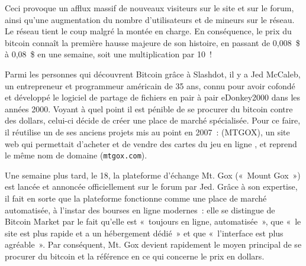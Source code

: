 Ceci provoque un afflux massif de nouveaux visiteurs sur le site et sur le forum, ainsi qu'une augmentation du nombre d'utilisateurs et de mineurs sur le réseau. Le réseau tient le coup malgré la montée en charge. En conséquence, le prix du bitcoin connaît la première hausse majeure de son histoire, en passant de 0,008~\$ à 0,08~\$ en une semaine, soit une multiplication par 10~!

Parmi les personnes qui découvrent Bitcoin grâce à Slashdot, il y a Jed McCaleb, un entrepreneur et programmeur américain de 35 ans, connu pour avoir cofondé et développé le logiciel de partage de fichiers en pair à pair eDonkey2000 dans les années 2000. Voyant à quel point il est pénible de se procurer du bitcoin contre des dollars, celui-ci décide de créer une place de marché spécialisée. Pour ce faire, il réutilise un de ses anciens projets mis au point en 2007~:  (MTGOX), un site web qui permettait d'acheter et de vendre des cartes du jeu en ligne , et reprend le même nom de domaine (\verb?mtgox.com?).

Une semaine plus tard, le 18, la plateforme d'échange Mt. Gox («~Mount Gox~») est lancée et annoncée officiellement sur le forum par Jed. Grâce à son expertise, il fait en sorte que la plateforme fonctionne comme une place de marché automatisée, à l'instar des bourses en ligne modernes~: elle se distingue de Bitcoin Market par le fait qu'elle est «~toujours en ligne, automatisée~», que «~le site est plus rapide et a un hébergement dédié~» et que «~l'interface est plus agréable~». Par conséquent, Mt. Gox devient rapidement le moyen principal de se procurer du bitcoin et la référence en ce qui concerne le prix en dollars.

